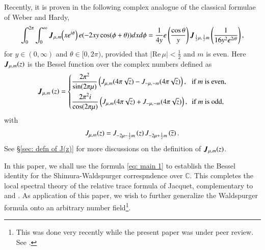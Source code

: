 \documentclass{amsproc}
\newcommand{\BC}{{\mathbb {C}}} \newcommand{\BD}{{\mathbb {D}}}
\def\lp {\left (}
\def\rp {\right )}
\renewcommand{\Re}{{\mathrm{Re}\,}}
\def\bfJ {\boldsymbol J}
\def\shskip{\hskip 0.5 pt}
\theoremstyle{plain}
\numberwithin{equation}{section}
\begin{document}
	
	Recently, it is proven in \cite{Qi-Sph,Qi-II-G} the following complex analogue of the classical formulae of Weber and Hardy,
	\begin{equation}\label{eq: main 1}
	\begin{split}
	\int_{0}^{2 \pi} \int_0^\infty \bfJ_{ \mu, \shskip m } \hskip - 2 pt \lp x e^{i\phi} \rp  e (- 2 x y \cos (\phi + \theta) )    d x  d \phi
	= \frac {1} {4 y}   e\lp \frac {\cos \theta } y \rp  \bfJ_{  \frac 12 \mu, \shskip \frac 1 2 m } \lp  \frac 1 {
		16 y^2  e^{2 i \theta}  } \rp ,
	\end{split}
	\end{equation}
	for $y \in (0, \infty)$ and $\theta \in [0, 2 \pi)$, provided that $|\Re \mu| < \frac 1 2$ and $m$ is even. Here $ \bfJ_{ \mu, \shskip m }  (z)$ is the   Bessel function over the complex numbers defined as
	\begin{equation*}%
		\bfJ_{ \mu,\shskip   m} \lp z \rp =
		\left\{
		\begin{split}
			& \frac {2 \pi^2} {\sin (2\pi \mu)} \lp J_{\mu,\shskip   m} (4 \pi \sqrt z) -  J_{-\mu,\shskip   -m} (4 \pi \sqrt z) \rp, \hskip 6.5 pt \text {if } m \text{ is even},\\
			& \frac {2 \pi^2 i} {\cos (2\pi \mu)} \lp J_{\mu,\shskip   m} (4 \pi \sqrt z) + J_{-\mu,\shskip   -m} (4 \pi \sqrt z) \rp, \hskip 5 pt \text {if }  m \text{ is odd},
		\end{split}
		\right.
	\end{equation*}
with
\begin{equation*}%
	J_{\mu,\shskip   m} (z) = J_{- 2\mu - \frac 12 m } \lp  z \rp J_{- 2\mu + \frac 12 m  } \lp  {\overline z} \rp.
\end{equation*}
	See \S \ref{sec: defn of J(z)} for more discussions on the definition of  $ \bfJ_{ \mu, \shskip m }  (z)$.
	
	In this paper, we shall use the formula \eqref{eq: main 1} to establish the Bessel identity for the  Shimura-Waldspurger correspndence over $\BC$. This  completes the local spectral theory of  the relative trace formula of Jacquet,  complementary to \cite{BaruchMao-NA} and \cite{BaruchMao-Real}. As application of this paper,  we wish to further generalize the Waldspurger formula  onto an arbitrary number field\footnote{This was done very recently while the present paper was under peer review. See \cite{Chai-Qi-Wald}.}.
	
\end{document}
